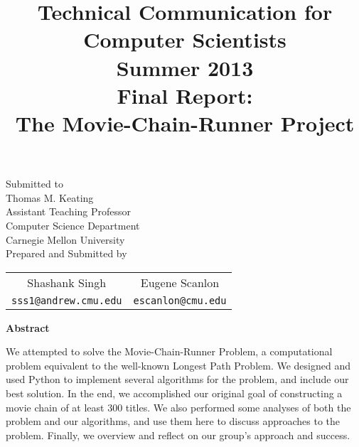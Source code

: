 \documentclass[11pt,english]{article}
\title{
{\normalsize \bf Technical Communication for Computer Scientists\\
Summer 2013}\\
\vspace{2cm}
{\bf Final Report:\\The Movie-Chain-Runner Project}}
\author{
}
\begin{document}
\begin{titlepage}
\maketitle
\vfill
\begin{center}
Submitted to\\
Thomas M. Keating\\
Assistant Teaching Professor\\
Computer Science Department\\
Carnegie Mellon University\\
\vspace{1cm}
Prepared and Submitted by\\
\vspace{0.5cm}

\begin{tabular}{cc}
Shashank Singh \hspace{2cm} & Eugene Scanlon \\
\texttt{sss1@andrew.cmu.edu} \hspace{2cm} & \texttt{escanlon@cmu.edu}
\end{tabular}

\vspace{2cm}
{\bf Abstract}\\
\end{center}
We attempted to solve the Movie-Chain-Runner Problem, a computational problem
equivalent to the well-known Longest Path Problem. We designed and used Python
to implement several algorithms for the problem, and include our best solution.
In the end, we accomplished our original goal of constructing a movie chain of
at least 300 titles. We also performed some analyses of both the problem and
our algorithms, and use them here to discuss approaches to the problem.
Finally, we overview and reflect on our group's approach and success.

\end{titlepage}
\end{document}
